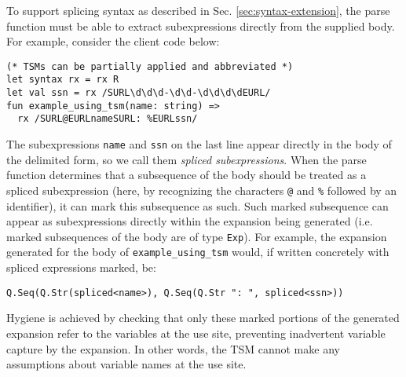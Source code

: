 To support splicing syntax as described in Sec. \ref{sec:syntax-extension}, the parse function must be able to extract subexpressions directly from the supplied body. For example, consider the client code below:
\begin{lstlisting}[numbers=none]
(* TSMs can be partially applied and abbreviated *)
let syntax rx = rx R
let val ssn = rx /SURL\d\d\d-\d\d-\d\d\d\dEURL/
fun example_using_tsm(name: string) => 
  rx /SURL@EURLnameSURL: %EURLssn/
\end{lstlisting}
The subexpressions \lstinline{name} and \lstinline{ssn} on the last line appear directly in the body of the delimited form, so we call them \emph{spliced subexpressions}. When the parse function determines that a subsequence of the body should be treated as a spliced subexpression (here, by recognizing the characters \lstinline{@} and \lstinline{%} followed by an  identifier), 
it can mark this subsequence as such. Such marked subsequence can appear as subexpressions directly within the expansion being generated (i.e. marked subsequences of the body are of type \lstinline{Exp}). For example, the expansion generated for the body of \lstinline{example_using_tsm} would, if written concretely with spliced expressions marked, be:
\begin{lstlisting}[numbers=none]
Q.Seq(Q.Str(spliced<name>), Q.Seq(Q.Str ": ", spliced<ssn>))
\end{lstlisting}
Hygiene is achieved by checking that only these marked portions of the generated expansion refer to the variables at the use site, preventing inadvertent variable capture by the expansion. In other words, the TSM cannot make any assumptions about variable names at the use site.%

